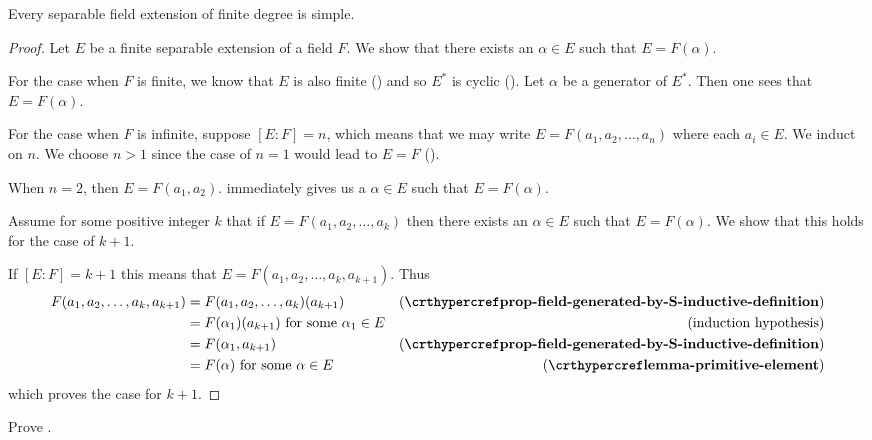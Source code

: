 \begin{theorem}\label{thrm-primitive-element}
    Every separable field extension of finite degree is simple.
\end{theorem}
\begin{proof}
    Let $E$ be a finite separable extension of a field $F$. We show that there exists an $\alpha \in E$ such that $E = F(\alpha)$.

    For the case when $F$ is finite, we know that $E$ is also finite () and so $E^\ast$ is cyclic (). Let $\alpha$ be a generator of $E^\ast$. Then one sees that $E = F(\alpha)$.

    For the case when $F$ is infinite, suppose $[E:F] = n$, which means that we may write $E = F(a_1, a_2, \dots, a_n)$ where each $a_i \in E$. We induct on $n$. We choose $n > 1$ since the case of $n = 1$ would lead to $E = F$ ().

    When $n = 2$, then $E = F(a_1, a_2)$.  immediately gives us a $\alpha \in E$ such that $E = F(\alpha)$.

    Assume for some positive integer $k$ that if $E = F(a_1, a_2, \dots, a_k)$ then there exists an $\alpha \in E$ such that $E = F(\alpha)$. We show that this holds for the case of $k + 1$.

    If $[E:F] = k + 1$ this means that $E = F(a_1, a_2, \dots, a_k, a_{k+1})$. Thus
    \begin{align*}
        F(a_1, a_2, \dots, a_k, a_{k+1}) &= F(a_1, a_2, \dots, a_k)(a_{k+1}) & (\myref{prop-field-generated-by-S-inductive-definition})\\
        &= F(\alpha_1)(a_{k+1}) \text{ for some } \alpha_1 \in E & (\text{induction hypothesis})\\
        &= F(\alpha_1, a_{k+1}) & (\myref{prop-field-generated-by-S-inductive-definition})\\
        &= F(\alpha) \text{ for some } \alpha \in E & (\myref{lemma-primitive-element})
    \end{align*}
    which proves the case for $k + 1$.
\end{proof}

\begin{exercise}\label{exercise-algebraic-extension-of-field-of-characteristic-0-is-separable}
    Prove .
\end{exercise}

